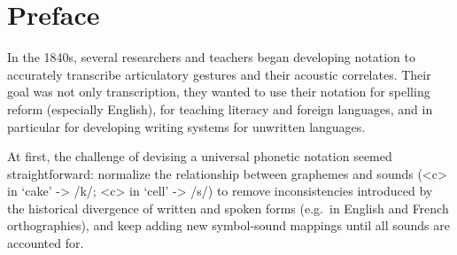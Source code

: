 \chapter{Preface}
\label{preface}






In the 1840s, several researchers and teachers began developing notation to accurately transcribe articulatory gestures and their acoustic correlates. Their goal was not only transcription, they wanted to use their notation for spelling reform (especially English), for teaching literacy and foreign languages, and in particular for developing writing systems for unwritten languages.

At first, the challenge of devising a universal phonetic notation seemed straightforward: normalize the relationship between graphemes and sounds (<c> in `cake' -> /k/; <c> in `cell' -> /s/) to remove inconsistencies introduced by the historical divergence of written and spoken forms (e.g.\ in English and French orthographies), and keep adding new symbol-sound mappings until all sounds are accounted for.



